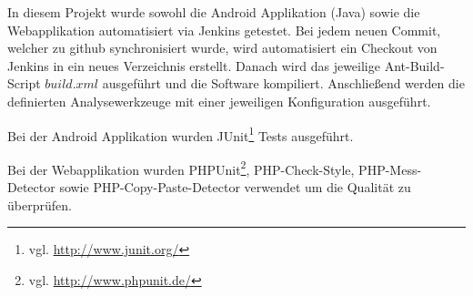 In diesem Projekt wurde sowohl die Android Applikation (Java) sowie die
	Webapplikation automatisiert via Jenkins getestet. Bei jedem neuen
	Commit, welcher zu github synchronisiert wurde, wird automatisiert
	ein Checkout von Jenkins in ein neues Verzeichnis erstellt. Danach
	wird das jeweilige Ant-Build-Script $build.xml$ ausgeführt und die
	Software kompiliert. Anschließend werden die definierten
	Analysewerkzeuge mit einer jeweiligen Konfiguration ausgeführt.
	
Bei der Android Applikation wurden JUnit\footnote{vgl.
	\url{http://www.junit.org/}} Tests ausgeführt.
	
Bei der Webapplikation wurden PHPUnit\footnote{vgl.
	\url{http://www.phpunit.de/}}, PHP-Check-Style, PHP-Mess-Detector sowie
	PHP-Copy-Paste-Detector verwendet um die Qualität zu überprüfen.
	

